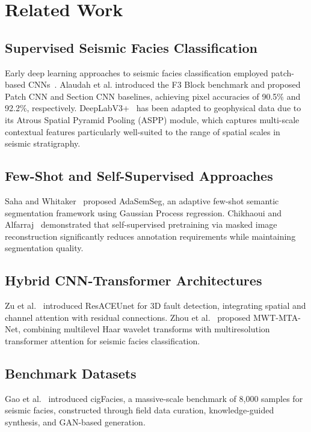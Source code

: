 \documentclass[journal]{IEEEtran}
\begin{document}
\section{Related Work}
\label{sec:related}

\subsection{Supervised Seismic Facies Classification}

Early deep learning approaches to seismic facies classification employed patch-based CNNs~\cite{alaudah2019}. Alaudah et al. introduced the F3 Block benchmark and proposed Patch CNN and Section CNN baselines, achieving pixel accuracies of 90.5\% and 92.2\%, respectively. DeepLabV3+~\cite{chen2018} has been adapted to geophysical data due to its Atrous Spatial Pyramid Pooling (ASPP) module, which captures multi-scale contextual features particularly well-suited to the range of spatial scales in seismic stratigraphy.

\subsection{Few-Shot and Self-Supervised Approaches}

Saha and Whitaker~\cite{saha2025} proposed AdaSemSeg, an adaptive few-shot semantic segmentation framework using Gaussian Process regression. Chikhaoui and Alfarraj~\cite{chikhaoui2024} demonstrated that self-supervised pretraining via masked image reconstruction significantly reduces annotation requirements while maintaining segmentation quality.

\subsection{Hybrid CNN-Transformer Architectures}

Zu et al.~\cite{zu2024} introduced ResACEUnet for 3D fault detection, integrating spatial and channel attention with residual connections. Zhou et al.~\cite{zhou2025} proposed MWT-MTA-Net, combining multilevel Haar wavelet transforms with multiresolution transformer attention for seismic facies classification.

\subsection{Benchmark Datasets}

Gao et al.~\cite{gao2025} introduced cigFacies, a massive-scale benchmark of 8{,}000 samples for seismic facies, constructed through field data curation, knowledge-guided synthesis, and GAN-based generation.
\end{document}
